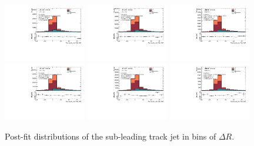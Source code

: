 \begin{figure}[htbp]
  \centering
 \includegraphics[width=0.32\textwidth]{figures/gbb/Sub_Sd0_Fits/Canv_Fit_02-DeltaR-025_LpT_INF_SpT_INF_coarse_y.pdf}
 \includegraphics[width=0.32\textwidth]{figures/gbb/Sub_Sd0_Fits/Canv_Fit_025-DeltaR-03_LpT_INF_SpT_INF_coarse_y.pdf}
 \includegraphics[width=0.32\textwidth]{figures/gbb/Sub_Sd0_Fits/Canv_Fit_03-DeltaR-04_LpT_INF_SpT_INF_coarse_y.pdf}\\
 \includegraphics[width=0.32\textwidth]{figures/gbb/Sub_Sd0_Fits/Canv_Fit_04-DeltaR-05_LpT_INF_SpT_INF_coarse_y.pdf}
 \includegraphics[width=0.32\textwidth]{figures/gbb/Sub_Sd0_Fits/Canv_Fit_05-DeltaR-06_LpT_INF_SpT_INF_coarse_y.pdf}
 \includegraphics[width=0.32\textwidth]{figures/gbb/Sub_Sd0_Fits/Canv_Fit_06-DeltaR-07_LpT_INF_SpT_INF_coarse_y.pdf}\\

\caption{Post-fit \subsdzero distributions of the sub-leading track jet in bins of $\Delta R$. }
  \label{fig:dR-postfits-subleading}
\end{figure}


